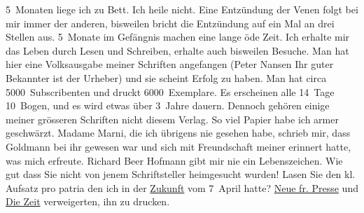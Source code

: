 \begin{ledgroupsized}[t]{13cm}
                    5 Monaten liege ich zu Bett. Ich heile nicht. Eine Entzündung der Venen folgt
                    bei mir immer der anderen, bisweilen bricht die Entzündung auf ein Mal an drei
                    Stellen aus. 5 Monate im Gefängnis machen eine lange öde Zeit. Ich erhalte mir
                    das Leben {\pb}durch Lesen und
                    Schreiben, erhalte auch bisweilen Besuche. Man hat hier eine Volksausgabe meiner Schriften angefangen
                        (Peter Nansen Ihr guter Bekannter ist der
                    Urheber) und sie scheint Erfolg zu haben. Man hat circa 5000 Subscribenten und
                    druckt 6000 Exemplare. Es erscheinen alle 14 Tage 10 Bogen, und es wird etwas
                    über 3 Jahre dauern. Dennoch gehören einige meiner grösseren Schriften nicht
                    diesem Verlag. So viel Papier habe ich armer geschwärzt.\pend
           \pstart
           Madame Marni, die ich übrigens nie gesehen
                    habe, schrieb mir, dass Goldmann bei ihr
                    gewesen war und sich mit Freundschaft meiner erinnert hatte, was mich erfreute.
                        Richard Beer Hofmann gibt mir nie {\pb}ein Lebenszeichen.\pend
           \pstart
           Wie gut dass Sie nicht von jenem Schriftsteller heimgesucht wurden! Lasen Sie den
                    kl. Aufsatz pro patria den
                    ich in der \uline{Zukunft} vom 7 April hatte?
                        \uline{Neue fr. Presse} und \uline{Die Zeit} verweigerten, ihn zu drucken.

\end{ledgroupsized}
